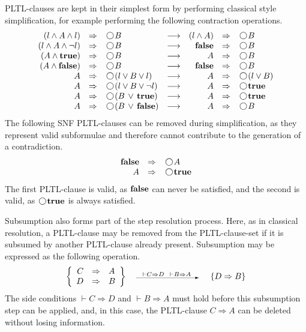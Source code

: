 \documentclass[nohyperref]{acmtrans2f}
\newcommand{\next}{\!\raisebox{-.2ex}{ %
                        \mbox{\unitlength=0.9ex
                        \begin{picture}(2,2)
                        \linethickness{0.06ex}
                        \put(1,1){\circle{2}} %
                        \end{picture}}}       %
                        \,}
\let\imp=\Rightarrow
\def\ltrue{\hbox{\rm\bf true}}
\def\lfalse{\hbox{\rm\bf false}}
\newcommand{\verylongrightarrow}{\raisebox{-.2ex}{
			    \begin{picture}(15,2)
			    \linethickness{0.06ex}
			    \put(-30,2){\vector(3,0){75}}
			    \end{picture}}
		       \,}
\def\llor{\,\lor\,}
\begin{document}
PLTL-clauses are kept in their simplest form by performing classical style
simplification, for example performing the following contraction
operations.
%
$$\begin{array}{rclcrcl}
 (l \land A \land l) & \Rightarrow & \next B & \longrightarrow & 
 (l \land A) & \Rightarrow & \next B \\
 (l \land A \land \neg l) & \Rightarrow & \next B & \longrightarrow & \lfalse &
 \Rightarrow & \next B \\ 
(A\land\ltrue)& \Rightarrow & \next B & \longrightarrow & A&
 \Rightarrow & \next B \\ 
(A\land\lfalse)& \Rightarrow & \next B & \longrightarrow & \lfalse &
 \Rightarrow & \next B \\ 
A  & \Rightarrow & \next (l \lor B \lor l) & \longrightarrow & A &
 \Rightarrow & \next (l \lor B) \\ 
A & \Rightarrow & \next (l \lor B \lor \neg l) & \longrightarrow & A &
 \Rightarrow & \next \ltrue \\
A & \Rightarrow & \next (B\llor\ltrue) & \longrightarrow & A &
 \Rightarrow & \next \ltrue \\ 
A & \Rightarrow & \next (B\llor\lfalse) & \longrightarrow & A &
 \Rightarrow & \next B
\end{array}$$
%
The following SNF PLTL-clauses can be removed during simplification, as they
represent valid subformulae and therefore cannot contribute to the
generation of a contradiction.
%
$$\begin{array}{rcl}
\lfalse & \Rightarrow & \next A \\ 
A & \Rightarrow & \next \ltrue
\end{array}$$
The first PLTL-clause is valid, as $\lfalse$ can never
be satisfied, and the second is valid, as $\next \ltrue$ is always 
satisfied.

Subsumption also forms part of the step resolution process.  Here, as
in classical resolution, a PLTL-clause may be removed from the PLTL-clause-set if it
is subsumed by another PLTL-clause already present. Subsumption may be
expressed as the following operation.
%
$$\begin{array}{rcl}
\left\{
\begin{array}{rcl}
C & \Rightarrow & A \\
D & \Rightarrow & B
\end{array}
\right\}~~~
&
\stackrel{\vdash C \Rightarrow D ~~\vdash B\Rightarrow A} {\verylongrightarrow}
&
~~~~\{ D  \Rightarrow  B \}
\end{array}
$$
The side conditions $\vdash C \Rightarrow D$ and $\vdash B \Rightarrow
A$ must hold before this subsumption step can be applied, and, in this
case, the PLTL-clause $C \imp A$ can be deleted without losing information.
\end{document}
